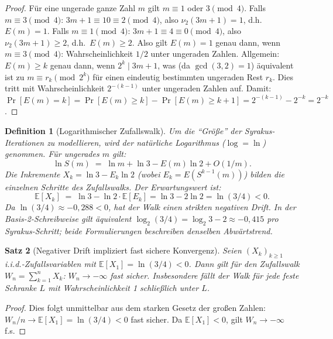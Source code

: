 \documentclass[12pt,a4paper]{article}
\newtheorem{theorem}{Satz}[section]
\newtheorem{definition}[theorem]{Definition}
\begin{document}
\begin{proof}
Für eine ungerade ganze Zahl $m$ gilt $m \equiv 1$ oder $3 \pmod{4}$.
Falls $m \equiv 3 \pmod{4}$: $3m+1 \equiv 10 \equiv 2 \pmod{4}$, also $\nu_2(3m+1) = 1$, d.h.\ $E(m)=1$.
Falls $m \equiv 1 \pmod{4}$: $3m+1 \equiv 4 \equiv 0 \pmod{4}$, also $\nu_2(3m+1) \geq 2$, d.h.\ $E(m)\geq 2$.
Also gilt $E(m) = 1$ genau dann, wenn $m \equiv 3 \pmod{4}$: Wahrscheinlichkeit $1/2$ unter ungeraden Zahlen.
Allgemein: $E(m) \geq k$ genau dann, wenn $2^k \mid 3m+1$, was (da $\gcd(3,2)=1$) äquivalent ist zu
$m \equiv r_k \pmod{2^k}$ für einen eindeutig bestimmten ungeraden Rest $r_k$.
Dies tritt mit Wahrscheinlichkeit $2^{-(k-1)}$ unter ungeraden Zahlen auf.
Damit: $\Pr[E(m) = k] = \Pr[E(m) \geq k] - \Pr[E(m) \geq k+1] = 2^{-(k-1)} - 2^{-k} = 2^{-k}$.
\end{proof}

\begin{definition}[Logarithmischer Zufallswalk]\label{def:zufallswalk}
Um die ``Größe'' der Syrakus-Iterationen zu modellieren, wird der natürliche Logarithmus
($\log = \ln$) genommen. Für ungerades $m$ gilt:
\[
  \ln S(m) \;=\; \ln m + \ln 3 - E(m) \ln 2 + O(1/m).
\]
Die Inkremente $X_k = \ln 3 - E_k \ln 2$ (wobei $E_k = E(S^{k-1}(m))$) bilden die
einzelnen Schritte des Zufallswalks. Der Erwartungswert ist:
\[
  \mathbb{E}[X_k] \;=\; \ln 3 - \ln 2 \cdot \mathbb{E}[E_k] = \ln 3 - 2\ln 2 = \ln(3/4) < 0.
\]
Da $\ln(3/4) \approx -0{,}288 < 0$, hat der Walk einen strikten negativen Drift.
In der Basis-2-Schreibweise gilt äquivalent $\log_2(3/4) = \log_2 3 - 2 \approx -0{,}415$
pro Syrakus-Schritt; beide Formulierungen beschreiben denselben Abwärtstrend.
\end{definition}

\begin{theorem}[Negativer Drift impliziert fast sichere Konvergenz]\label{thm:drift}
Seien $(X_k)_{k \geq 1}$ i.i.d.-Zufallsvariablen mit $\mathbb{E}[X_1] = \ln(3/4) < 0$.
Dann gilt für den Zufallswalk $W_n = \sum_{k=1}^n X_k$: $W_n \to -\infty$ fast sicher.
Insbesondere fällt der Walk für jede feste Schranke $L$ mit Wahrscheinlichkeit 1
schließlich unter $L$.
\end{theorem}

\begin{proof}
Dies folgt unmittelbar aus dem starken Gesetz der großen Zahlen: $W_n/n \to \mathbb{E}[X_1] = \ln(3/4) < 0$
fast sicher. Da $\mathbb{E}[X_1] < 0$, gilt $W_n \to -\infty$ f.s.
\end{proof}
\end{document}
